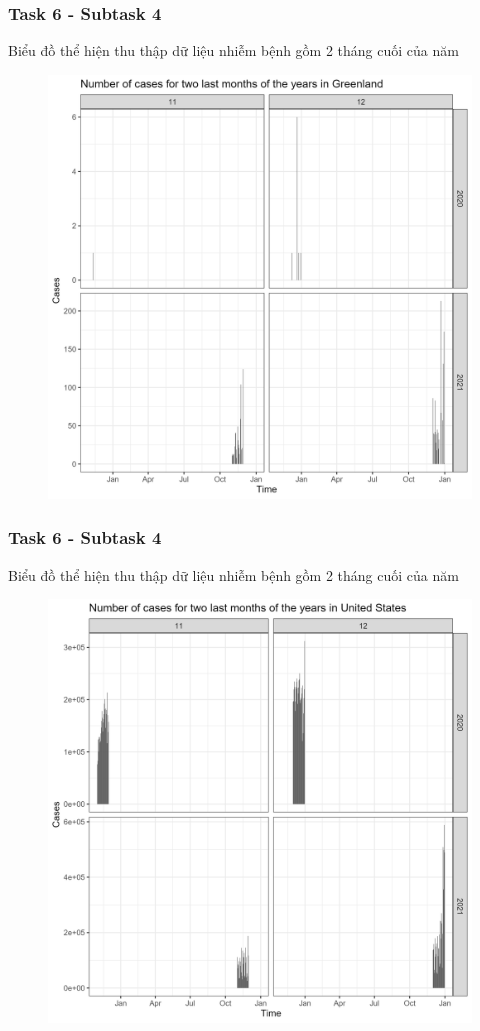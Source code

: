 \documentclass[english,10pt,table]{beamer}
\begin{document}
\frame
{
    \frametitle{Task 6 - Subtask 4}
    \begin{block}{Biểu đồ thể hiện thu thập dữ liệu nhiễm bệnh gồm 2 tháng cuối của năm}
    \begin{figure}[H]
		\centering
		\includegraphics[scale=0.105]{images/6.4.2.png}
	\end{figure}
    \end{block}
}
\frame
{
    \frametitle{Task 6 - Subtask 4}
    \begin{block}{Biểu đồ thể hiện thu thập dữ liệu nhiễm bệnh gồm 2 tháng cuối của năm}
    \begin{figure}[H]
		\centering
		\includegraphics[scale=0.105]{images/6.4.3.png}
	\end{figure}
    \end{block}
}
\end{document}
